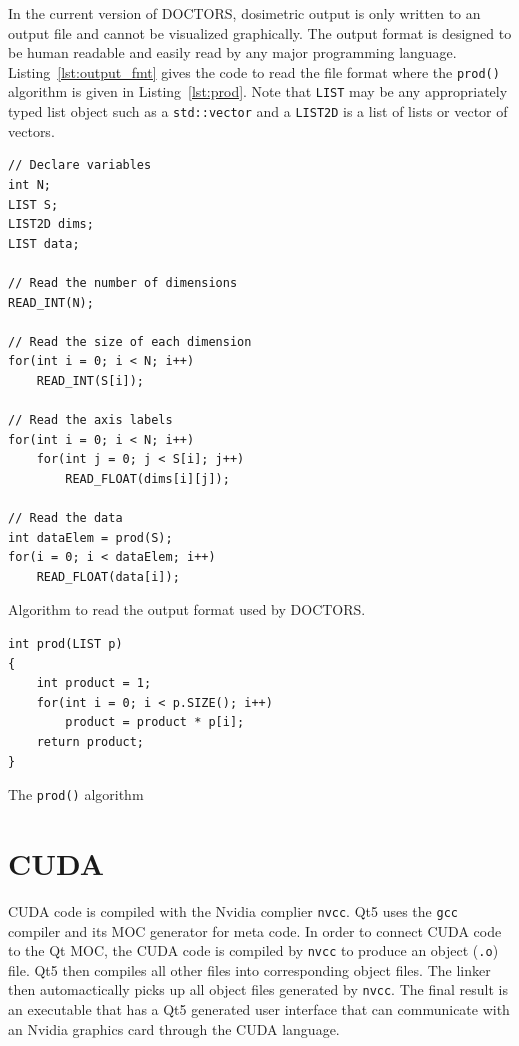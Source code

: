 In the current version of DOCTORS, dosimetric output is only written to an output file and cannot be visualized graphically. The output format is designed to be human readable and easily read by any major programming language. Listing~\ref{lst:output_fmt} gives the code to read the file format where the \texttt{prod()} algorithm is given in Listing~\ref{lst:prod}. Note that \texttt{LIST} may be any appropriately typed list object such as a \texttt{std::vector} and a \texttt{LIST2D} is a list of lists or vector of vectors.

\begin{listing}
\begin{verbatim}
// Declare variables
int N;
LIST S;
LIST2D dims;
LIST data;

// Read the number of dimensions
READ_INT(N);

// Read the size of each dimension
for(int i = 0; i < N; i++)
	READ_INT(S[i]);
	
// Read the axis labels
for(int i = 0; i < N; i++)
	for(int j = 0; j < S[i]; j++)
		READ_FLOAT(dims[i][j]);
		
// Read the data
int dataElem = prod(S);
for(i = 0; i < dataElem; i++)
	READ_FLOAT(data[i]);
\end{verbatim}
\caption{Algorithm to read the output format used by DOCTORS.}\label{lst:output_fmt}
\end{listing}

\begin{listing}
\begin{verbatim}
int prod(LIST p)
{
	int product = 1;
	for(int i = 0; i < p.SIZE(); i++)
		product = product * p[i];
	return product;
}
\end{verbatim}
\caption{The \texttt{prod()} algorithm}\label{lst:prod}
\end{listing}

\section{CUDA}\label{sec:cuda}
CUDA code is compiled with the Nvidia complier \texttt{nvcc}. Qt5 uses the \texttt{gcc} compiler and its MOC generator for meta code. In order to connect CUDA code to the Qt MOC, the CUDA code is compiled by \texttt{nvcc} to produce an object (\texttt{.o}) file. Qt5 then compiles all other files into corresponding object files. The linker then automactically picks up all object files generated by \texttt{nvcc}. The final result is an executable that has a Qt5 generated user interface that can communicate with an Nvidia graphics card through the CUDA language.

